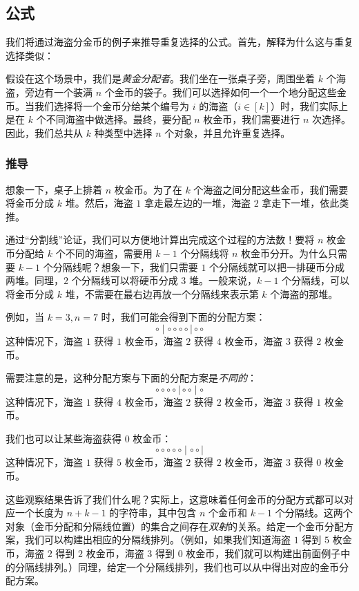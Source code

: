 
\subsection{公式}

我们将通过海盗分金币的例子来推导重复选择的公式。首先，解释为什么这与重复选择类似：

假设在这个场景中，我们是\emph{黄金分配者}。我们坐在一张桌子旁，周围坐着 $k$ 个海盗，旁边有一个装满 $n$ 个金币的袋子。我们可以选择如何一个一个地分配这些金币。当我们选择将一个金币分给某个编号为 $i$ 的海盗（$i \in [k]$）时，我们实际上是在 $k$ 个不同海盗中做选择。最终，要分配 $n$ 枚金币，我们需要进行 $n$ 次选择。因此，我们总共从 $k$ 种类型中选择 $n$ 个对象，并且允许重复选择。

\subsubsection*{推导}

想象一下，桌子上排着 $n$ 枚金币。为了在 $k$ 个海盗之间分配这些金币，我们需要将金币分成 $k$ 堆。然后，海盗 $1$ 拿走最左边的一堆，海盗 $2$ 拿走下一堆，依此类推。

通过``分割线''论证，我们可以方便地计算出完成这个过程的方法数！要将 $n$ 枚金币分配给 $k$ 个不同的海盗，需要用 $k - 1$ 个分隔线将 $n$ 枚金币分开。为什么只需要 $k - 1$ 个分隔线呢？想象一下，我们只需要 $1$ 个分隔线就可以把一排硬币分成两堆。同理，$2$ 个分隔线可以将硬币分成 $3$ 堆。一般来说，$k - 1$ 个分隔线，可以将金币分成 $k$ 堆，不需要在最右边再放一个分隔线来表示第 $k$ 个海盗的那堆。

\begin{example}
    例如，当 $k=3, n=7$ 时，我们可能会得到下面的分配方案：
    \[\circ \mid \circ \circ \circ \circ \mid \circ \circ\]
    这种情况下，海盗 $1$ 获得 $1$ 枚金币，海盗 $2$ 获得 $4$ 枚金币，海盗 $3$ 获得 $2$ 枚金币。

    需要注意的是，这种分配方案与下面的分配方案是\emph{不同的}：
    \[\circ \circ \circ \circ \mid \circ \circ \mid \circ\]
    这种情况下，海盗 $1$ 获得 $4$ 枚金币，海盗 $2$ 获得 $2$ 枚金币，海盗 $3$ 获得 $1$ 枚金币。

    我们也可以让某些海盗获得 $0$ 枚金币：
    \[\circ \circ \circ \circ \circ \mid \circ \circ \mid\]
    这种情况下，海盗 $1$ 获得 $5$ 枚金币，海盗 $2$ 获得 $2$ 枚金币，海盗 $3$ 获得 $0$ 枚金币。
\end{example}

这些观察结果告诉了我们什么呢？实际上，这意味着任何金币的分配方式都可以对应一个长度为 $n + k - 1$ 的字符串，其中包含 $n$ 个金币和 $k - 1$ 个分隔线。这两个对象（金币分配和分隔线位置）的集合之间存在\emph{双射}的关系。给定一个金币分配方案，我们可以构建出相应的分隔线排列。（例如，如果我们知道海盗 $1$ 得到 $5$ 枚金币，海盗 $2$ 得到 $2$ 枚金币，海盗 $3$ 得到 $0$ 枚金币，我们就可以构建出前面例子中的分隔线排列。）同理，给定一个分隔线排列，我们也可以从中得出对应的金币分配方案。


